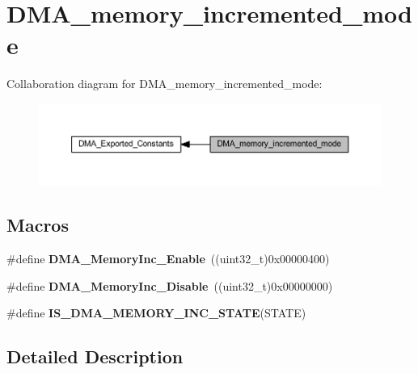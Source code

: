 \hypertarget{group___d_m_a__memory__incremented__mode}{}\section{D\+M\+A\+\_\+memory\+\_\+incremented\+\_\+mode}
\label{group___d_m_a__memory__incremented__mode}
Collaboration diagram for D\+M\+A\+\_\+memory\+\_\+incremented\+\_\+mode\+:\nopagebreak
\begin{figure}[H]
\begin{center}
\leavevmode
\includegraphics[width=350pt]{group___d_m_a__memory__incremented__mode}
\end{center}
\end{figure}
\subsection*{Macros}
\begin{DoxyCompactItemize}
\item 
\mbox{\label{group___d_m_a__memory__incremented__mode_ga4e8cb23d039c74bbbf365d7678835bbb}} 
\#define {\bfseries D\+M\+A\+\_\+\+Memory\+Inc\+\_\+\+Enable}~((uint32\+\_\+t)0x00000400)
\item 
\mbox{\label{group___d_m_a__memory__incremented__mode_ga795a277c997048783a383b026f19a5ab}} 
\#define {\bfseries D\+M\+A\+\_\+\+Memory\+Inc\+\_\+\+Disable}~((uint32\+\_\+t)0x00000000)
\item 
\#define {\bfseries I\+S\+\_\+\+D\+M\+A\+\_\+\+M\+E\+M\+O\+R\+Y\+\_\+\+I\+N\+C\+\_\+\+S\+T\+A\+TE}(S\+T\+A\+TE)
\end{DoxyCompactItemize}


\subsection{Detailed Description}


